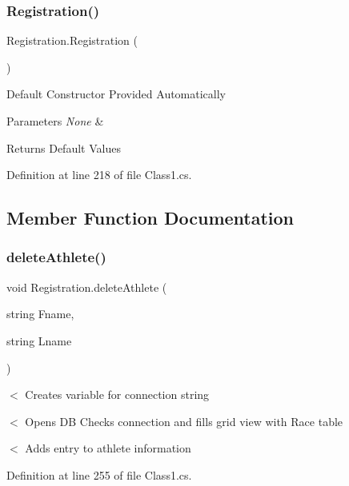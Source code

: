 \subsubsection{\texorpdfstring{Registration()}{Registration()}}
{\footnotesize\ttfamily Registration.\+Registration (\begin{DoxyParamCaption}{ }\end{DoxyParamCaption})\hspace{0.3cm}{\ttfamily [inline]}}

Default Constructor Provided Automatically 
\begin{DoxyParams}{Parameters}
{\em None} & \\
\hline
\end{DoxyParams}
\begin{DoxyReturn}{Returns}
Default Values 
\end{DoxyReturn}


Definition at line 218 of file Class1.\+cs.



\subsection{Member Function Documentation}
\mbox{\label{classRegistration_ab8effd4c7b67d1e767530a2534d8b354}} 
\subsubsection{\texorpdfstring{delete\+Athlete()}{deleteAthlete()}}
{\footnotesize\ttfamily void Registration.\+delete\+Athlete (\begin{DoxyParamCaption}\item[{string}]{Fname,  }\item[{string}]{Lname }\end{DoxyParamCaption})\hspace{0.3cm}{\ttfamily [inline]}}

$<$ Creates variable for connection string

$<$ Opens DB Checks connection and fills grid view with Race table

$<$ Adds entry to athlete information 

Definition at line 255 of file Class1.\+cs.

\mbox{\label{classRegistration_aa0b6171c6cfb18e6c67f003d776914de}} 
